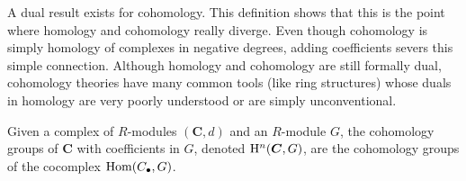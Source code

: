 A dual result exists for cohomology. This definition shows that this is the point where homology and cohomology really diverge. Even though cohomology is simply homology of complexes in negative degrees, adding coefficients severs this simple connection. Although homology and cohomology are still formally dual, cohomology theories have many common tools (like ring structures) whose duals in homology are very poorly understood or are simply unconventional.

\begin{defn}
    Given a complex of $R$-modules $(\bm{C},d)$ and an $R$-module $G$, the cohomology groups of $\bm{C}$ with coefficients in $G$, denoted $\mathrm{H}^n(\boldsymbol{C},G)$, are the cohomology groups of the cocomplex $\operatorname{Hom}(C_\bullet,G)$.
\end{defn}


